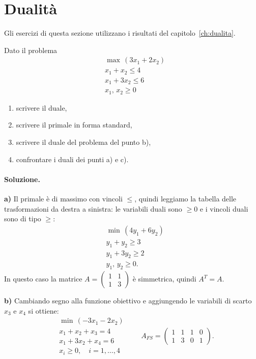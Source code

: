 \section{Dualità}\label{sec:es-dualita}
Gli esercizi di questa sezione utilizzano i risultati del capitolo~\ref{ch:dualita}.

\begin{esercizio}
Dato il problema
\[
\begin{aligned}
&\max\, (3x_1 + 2x_2) \\
&x_1 + x_2 \le 4 \\
&x_1 + 3x_2 \le 6 \\
&x_1,\, x_2 \ge 0
\end{aligned}
\]
\begin{enumerate}[label=\alph*)]
    \item scrivere il duale,
    \item scrivere il primale in forma standard,
    \item scrivere il duale del problema del punto b),
    \item confrontare i duali dei punti a) e c).
\end{enumerate}
\end{esercizio}

\paragraph{Soluzione.}
\textbf{a)} Il primale è di massimo con vincoli $\le$, quindi leggiamo la tabella delle trasformazioni da destra a sinistra: le variabili duali sono $\ge 0$ e i vincoli duali sono di tipo $\ge$:
\[
\begin{aligned}
&\min\, (4y_1 + 6y_2) \\
&y_1 + y_2 \ge 3 \\
&y_1 + 3y_2 \ge 2 \\
&y_1,\, y_2 \ge 0.
\end{aligned}
\]
In questo caso la matrice $A = \begin{pmatrix} 1 & 1 \\ 1 & 3 \end{pmatrix}$ è simmetrica, quindi $A^T = A$.

\textbf{b)} Cambiando segno alla funzione obiettivo e aggiungendo le variabili di scarto $x_3$ e $x_4$ si ottiene:
\[
\begin{aligned}
&\min\, (-3x_1 - 2x_2) \\
&x_1 + x_2 + x_3 = 4 \\
&x_1 + 3x_2 + x_4 = 6 \\
&x_i \ge 0, \quad i = 1, \dots, 4
\end{aligned}
\qquad
A_{FS} = \begin{pmatrix} 1 & 1 & 1 & 0 \\ 1 & 3 & 0 & 1 \end{pmatrix}.
\]

